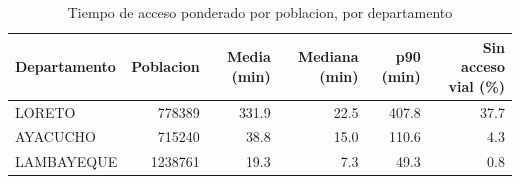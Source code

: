 \begin{table}[htbp]
\caption{Tiempo de acceso ponderado por poblacion, por departamento}
\label{tab:acceso-dep}
\begin{tabular}{lrrrrr}
\toprule
Departamento & Poblacion & Media (min) & Mediana (min) & p90 (min) & Sin acceso vial (\%) \\
\midrule
LORETO & 778389 & 331.9 & 22.5 & 407.8 & 37.7 \\
AYACUCHO & 715240 & 38.8 & 15.0 & 110.6 & 4.3 \\
LAMBAYEQUE & 1238761 & 19.3 & 7.3 & 49.3 & 0.8 \\
\bottomrule
\end{tabular}
\end{table}
